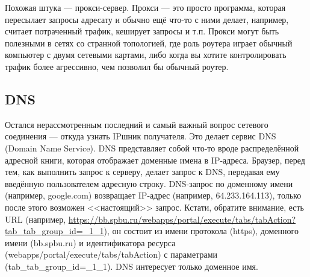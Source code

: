 \documentclass{../../text-style}
\begin{document}
Похожая штука --- прокси-сервер. Прокси --- это просто программа, которая пересылает запросы адресату и обычно ещё что-то с ними делает, например, считает потраченный трафик, кеширует запросы и т.п. Прокси могут быть полезными в сетях со странной топологией, где роль роутера играет обычный компьютер с двумя сетевыми картами, либо когда вы хотите контролировать трафик более агрессивно, чем позволил бы обычный роутер.

\subsection{DNS}

Остался нерассмотренным последний и самый важный вопрос сетевого соединения --- откуда узнать IPшник получателя. Это делает сервис DNS (Domain Name Service). DNS представляет собой что-то вроде распределённой адресной книги, которая отображает доменные имена в IP-адреса. Браузер, перед тем, как выполнить запрос к серверу, делает запрос к DNS, передавая ему введённую пользователем адресную строку. DNS-запрос по доменному имени (например, google.com) возвращает IP-адрес (например, 64.233.164.113), только после этого возможен <<настоящий>> запрос. Кстати, обратите внимание, есть URL (например, \url{https://bb.spbu.ru/webapps/portal/execute/tabs/tabAction?tab_tab_group_id=_1_1}), он состоит из имени протокола (https), доменного имени (bb.spbu.ru) и идентификатора ресурса (webapps/portal/execute/tabs/tabAction) с параметрами (tab\_tab\_group\_id=\_1\_1). DNS интересует только доменное имя.
\end{document}
